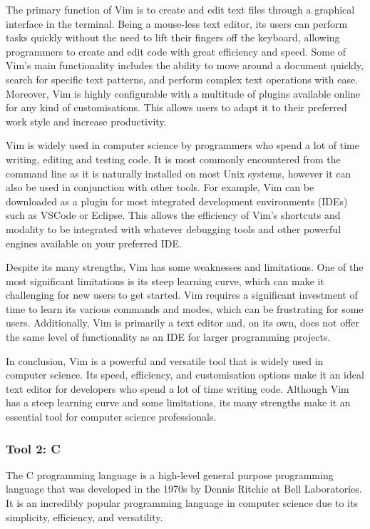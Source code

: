 \documentclass[a4paper, 11pt]{report}
\begin{document}
The primary function of Vim is to create and edit text files through a graphical interface in the terminal. Being a mouse-less text editor, its users can perform tasks quickly without the need to lift their fingers off the keyboard, allowing programmers to create and edit code with great efficiency and speed. Some of Vim's main functionality includes the ability to move around a document quickly, search for specific text patterns, and perform complex text operations with ease. Moreover, Vim is highly configurable with a multitude of plugins available online for any kind of customisations. This allows users to adapt it to their preferred work style and increase productivity.

Vim is widely used in computer science by programmers who spend a lot of time writing, editing and testing code. It is most commonly encountered from the command line as it is naturally installed on most Unix systems, however it can also be used in conjunction with other tools. For example, Vim can be downloaded as a plugin for most integrated development environments (IDEs) such as VSCode or Eclipse. This allows the efficiency of Vim’s shortcuts and modality to be integrated with whatever debugging tools and other powerful engines available on your preferred IDE.

Despite its many strengths, Vim has some weaknesses and limitations. One of the most significant limitations is its steep learning curve, which can make it challenging for new users to get started. Vim requires a significant investment of time to learn its various commands and modes, which can be frustrating for some users. Additionally, Vim is primarily a text editor and, on its own, does not offer the same level of functionality as an IDE for larger programming projects.

In conclusion, Vim is a powerful and versatile tool that is widely used in computer science. Its speed, efficiency, and customisation options make it an ideal text editor for developers who spend a lot of time writing code. Although Vim has a steep learning curve and some limitations, its many strengths make it an essential tool for computer science professionals.

\subsubsection{Tool 2: C}

The C programming language is a high-level general purpose programming language that was developed in the 1970s by Dennis Ritchie at Bell Laboratories. It is an incredibly popular programming language in computer science due to its simplicity, efficiency, and versatility.
\end{document}
